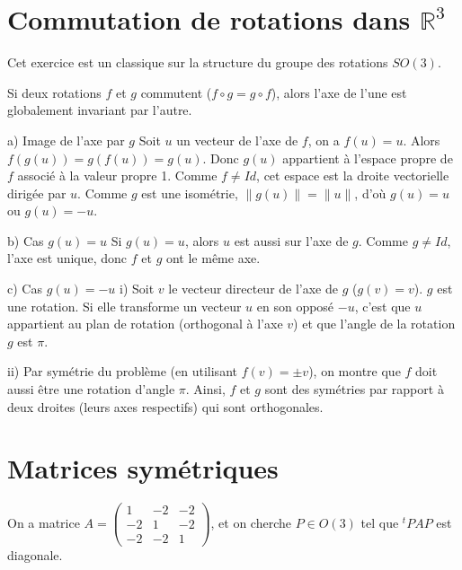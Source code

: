 \documentclass[french]{yLectureNote}
\begin{document}

\section{Commutation de rotations dans $\mathbb{R}^3$}

Cet exercice est un classique sur la structure du groupe des rotations $SO(3)$.

\begin{theorem}
Si deux rotations $f$ et $g$ commutent ($f\circ g=g\circ f$), alors l'axe de l'une est globalement invariant par l'autre.
\end{theorem}


a) Image de l'axe par $g$
Soit $u$ un vecteur de l'axe de $f$, on a $f(u) = u$.
Alors $f(g(u)) = g(f(u)) = g(u)$.
Donc $g(u)$ appartient à l'espace propre de $f$ associé à la valeur propre 1. Comme $f \neq Id$, cet espace est la droite vectorielle dirigée par $u$.
Comme $g$ est une isométrie, $\|g(u)\| = \|u\|$, d'où $g(u) = u$ ou $g(u) = -u$.

b) Cas $g(u) = u$
Si $g(u) = u$, alors $u$ est aussi sur l'axe de $g$. Comme $g \neq Id$, l'axe est unique, donc $f$ et $g$ ont le même axe.

c) Cas $g(u) = -u$
i) Soit $v$ le vecteur directeur de l'axe de $g$ ($g(v)=v$).
$g$ est une rotation. Si elle transforme un vecteur $u$ en son opposé $-u$, c'est que $u$ appartient au plan de rotation (orthogonal à l'axe $v$) et que l'angle de la rotation $g$ est $\pi$.

ii) Par symétrie du problème (en utilisant $f(v)=\pm v$), on montre que $f$ doit aussi être une rotation d'angle $\pi$.
Ainsi, $f$ et $g$ sont des symétries par rapport à deux droites (leurs axes respectifs) qui sont orthogonales.

\section{Matrices symétriques}
On a matrice $A = \begin{pmatrix} 1 & -2 & -2 \\ -2 & 1 & -2 \\ -2 & -2 & 1 \end{pmatrix}$, et on cherche $P\in O(3)$ tel que $^tPAP$ est diagonale.
\end{document}
